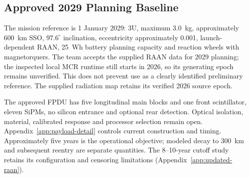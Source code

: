\subsection{Approved 2029 Planning Baseline}
\label{app:latest-baseline}
The mission reference is 1 January 2029: 3U, maximum 3.0~kg, approximately 600~km SSO, $97.6^\circ$ inclination, eccentricity approximately 0.001, launch-dependent RAAN, 25~Wh battery planning capacity and reaction wheels with magnetorquers. The team accepts the supplied RAAN data for 2029 planning; the inspected local MCR runtime still starts in 2026, so its generating epoch remains unverified. This does not prevent use as a clearly identified preliminary reference. The supplied radiation map retains its verified 2026 source epoch.

The approved FPDU has five longitudinal main blocks and one front scintillator, eleven SiPMs, no silicon entrance and optional rear detection. Optical isolation, material, calibrated response and processor selection remain open. Appendix~\ref{app:payload-detail} controls current construction and timing. Approximately five years is the operational objective; modeled decay to 300~km and subsequent reentry are separate quantities. The 8--10-year cutoff study retains its configuration and censoring limitations (Appendix~\ref{app:updated-raan}).
